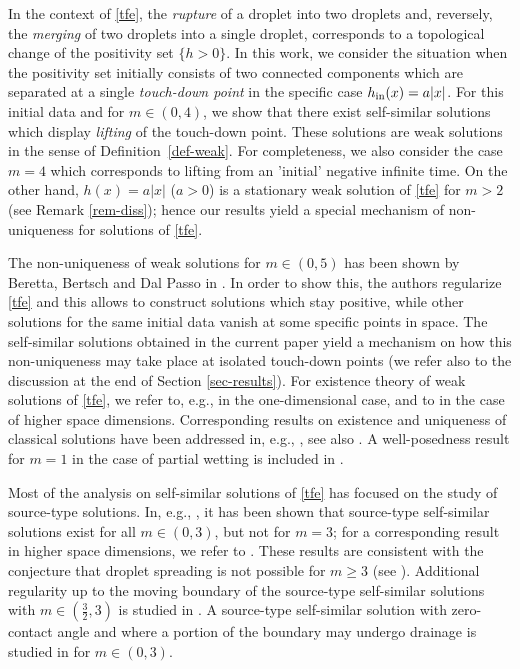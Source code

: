 \documentclass{article}%
\begin{document}
In the context of \eqref{tfe}, the {\em rupture} of a droplet into two droplets
and, reversely, the {\em merging} of two droplets into a single droplet, 
corresponds to a topological change of the positivity set $\{ h > 0 \}$. In this
work, we consider the situation when the positivity set initially consists of
two connected components which are separated at a single {\em touch-down point}
in the specific case $h_{\rm in}(x) = a |x|$. For this initial data and for
$m \in (0,4)$, we show that there exist self-similar solutions which display
{\em lifting} of the touch-down point. These solutions are weak solutions in the
sense of Definition~\ref{def-weak}. For completeness, we also consider the case
$m=4$ which corresponds to lifting from an 'initial' negative infinite time. On
the other hand, $h(x)=a|x|$ ($a>0$) is a stationary weak solution of \eqref{tfe}
for $m > 2$ (see Remark \ref{rem-diss}); hence our results yield a special
mechanism of non-uniqueness for solutions of \eqref{tfe}.


The non-uniqueness of weak solutions for $m \in (0,5)$ has been shown
by Beretta, Bertsch and Dal Passo in \cite{BerettaBertschDalpasso-1995}. In
order to show this, the authors regularize \eqref{tfe} and this
allows to construct solutions which stay positive, while other solutions 
for the same initial data vanish at some specific points in space. The self-similar solutions
obtained in the current paper yield a mechanism on how this non-uniqueness may
take place at isolated touch-down points (we refer also to the discussion at
  the end of Section \ref{sec-results}). For existence theory of weak
  solutions of \eqref{tfe}, we refer to, e.g., 
\cite{BerettaBertschDalpasso-1995, BernisFriedman-1990,BertozziPugh-1996} 
in the one-dimensional case, and to 
\cite{BertschDalpassoGarckeGruen-1998,DalpassoGarckeGruen-1998,Gruen-2004-1}
 in the case of higher space dimensions. Corresponding results on
 existence and uniqueness of classical solutions have been addressed in, e.g.,
 \cite{GiacomelliGnannKnuepferOtto-2014,GiacomelliKnuepfer-2010,GiacomelliKnuepferOtto-2008,John-2015,Knuepfer-2011}, see also \cite{Gnann-2016}. A well-posedness result for $m=1$ in the case of partial wetting is included in \cite{KnuepferMasmoudi-2013,KnuepferMasmoudi-2015}.


Most of the analysis on self-similar solutions of \eqref{tfe} 
has focused on the study of source-type solutions. In, e.g., 
\cite{BernisPeletierWilliams-1992}, it has been shown that source-type self-similar 
solutions exist for all $m \in (0,3)$, but not for $m = 3$; for a corresponding result 
in higher space dimensions, we refer to \cite{BernisFerreira-1997}. These results are 
consistent with the conjecture that droplet spreading is not possible for $m \geq 3$ (see
\cite{DussanDavis-1974,HuhScriven-1971}). Additional regularity up to the moving 
boundary of the source-type self-similar solutions with $m\in(\frac 32,3)$ is
studied in \cite{GiacomelliGnannOtto-2013}. A source-type self-similar solution
with zero-contact angle and where a portion of the boundary may undergo drainage is
studied in \cite{BernisHulshofKing-2000} for $m \in (0,3)$.
\end{document}
